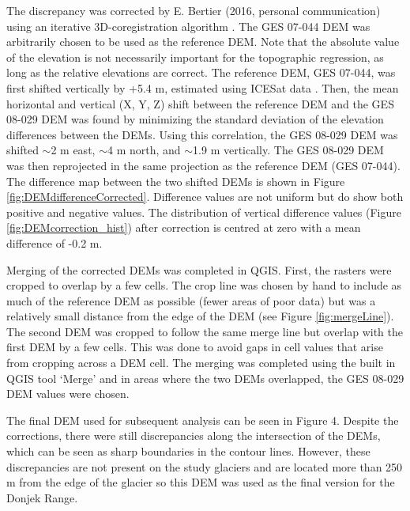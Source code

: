 \documentclass[12pt]{article}
\begin{document}
The discrepancy was corrected by E. Bertier (2016, personal communication) using an iterative 3D-coregistration algorithm \citep{Berthier2007}. The GES 07-044 DEM was arbitrarily chosen to be used as the reference DEM. Note that the absolute value of the elevation is not necessarily important for the topographic regression, as long as the relative elevations are correct. The reference DEM, GES 07-044, was first shifted vertically by +5.4 m, estimated using ICESat data \citep{Berthier2010}. Then, the mean horizontal and vertical (X, Y, Z) shift between the reference DEM and the GES 08-029 DEM was found by minimizing the standard deviation of the elevation differences between the DEMs. Using this correlation, the GES 08-029 DEM  was shifted $\sim$2 m east, $\sim$4 m north, and $\sim$1.9 m vertically. The GES 08-029 DEM was then reprojected in the same projection as the reference DEM (GES 07-044). The difference map between the two shifted DEMs is shown in Figure \ref{fig:DEMdifferenceCorrected}. Difference values are not uniform but do show both positive and negative values. The distribution of vertical difference values (Figure \ref{fig:DEMcorrection_hist}) after correction is centred at zero with a mean difference of -0.2 m.

Merging of the corrected DEMs was completed in QGIS. First, the rasters were cropped to overlap by a few cells. The crop line was chosen by hand to include as much of the reference DEM as possible (fewer areas of poor data) but was a relatively small distance from the edge of the DEM (see Figure \ref{fig:mergeLine}). The second DEM was cropped to follow the same merge line but overlap with the first DEM by a few cells. This was done to avoid gaps in cell values that arise from cropping across a DEM cell. The merging was completed using the built in QGIS tool `Merge' and in areas where the two DEMs overlapped, the GES 08-029 DEM values were chosen.

The final DEM used for subsequent analysis can be seen in Figure 4. Despite the corrections, there were still discrepancies along the intersection of the DEMs, which can be seen as sharp boundaries in the contour lines. However, these discrepancies are not present on the study glaciers and are located more than 250 m from the edge of the glacier so this DEM was used as the final version for the Donjek Range.
\end{document}

